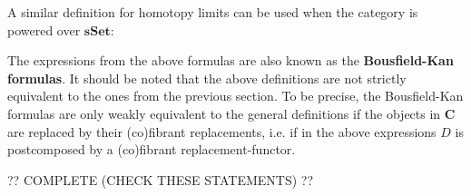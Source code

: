     A similar definition for homotopy limits can be used when the category is powered over $\mathbf{sSet}$:
    \begin{remark}
        The expressions from the above formulas are also known as the \textbf{Bousfield-Kan formulas}. It should be noted that the above definitions are not strictly equivalent to the ones from the previous section. To be precise, the Bousfield-Kan formulas are only weakly equivalent to the general definitions if the objects in $\mathbf{C}$ are replaced by their (co)fibrant replacements, i.e. if in the above expressions $D$ is postcomposed by a (co)fibrant replacement-functor.
    \end{remark}

    ?? COMPLETE (CHECK THESE STATEMENTS) ??

